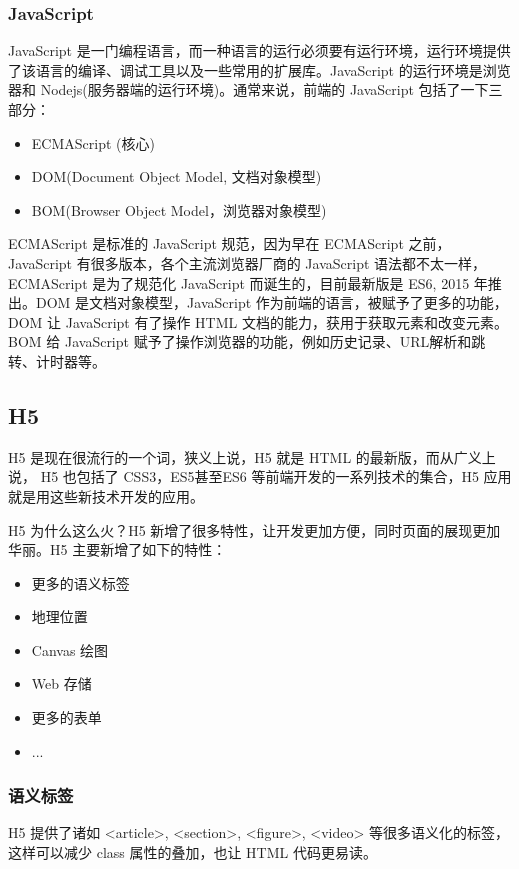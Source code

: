 \documentclass[UTF8]{ctexbook}
\begin{document}
{{            \subsubsection{JavaScript}
              \label{subsubsec:javascript}
                JavaScript 是一门编程语言，而一种语言的运行必须要有运行环境，运行环境提供了该语言的编译、调试工具以及一些常用的扩展库。JavaScript 的运行环境是浏览器和 Nodejs(服务器端的运行环境)。通常来说，前端的 JavaScript 包括了一下三部分：
                \begin{itemize}
                  \item ECMAScript (核心)
                  \item DOM(Document Object Model, 文档对象模型)
                  \item BOM(Browser Object Model，浏览器对象模型)
                \end{itemize}
                ECMAScript 是标准的 JavaScript 规范，因为早在 ECMAScript 之前，JavaScript 有很多版本，各个主流浏览器厂商的 JavaScript 语法都不太一样，ECMAScript 是为了规范化 JavaScript 而诞生的，目前最新版是 ES6, 2015 年推出。DOM 是文档对象模型，JavaScript 作为前端的语言，被赋予了更多的功能，DOM 让 JavaScript 有了操作 HTML 文档的能力，获用于获取元素和改变元素。BOM 给 JavaScript 赋予了操作浏览器的功能，例如历史记录、URL解析和跳转、计时器等。

        \subsection{H5}
          \label{subsec:h5}
            H5 是现在很流行的一个词，狭义上说，H5 就是 HTML 的最新版，而从广义上说， H5 也包括了 CSS3，ES5甚至ES6 等前端开发的一系列技术的集合，H5 应用就是用这些新技术开发的应用。
            \par
            H5 为什么这么火？H5 新增了很多特性，让开发更加方便，同时页面的展现更加华丽。H5 主要新增了如下的特性：
            \begin{itemize}
              \item 更多的语义标签
              \item 地理位置
              \item Canvas 绘图
              \item Web 存储
              \item 更多的表单
              \item ...
            \end{itemize}
            \subsubsection{语义标签}
              \label{subsubsec:语义标签}
                H5 提供了诸如 <article>, <section>, <figure>, <video> 等很多语义化的标签，这样可以减少 class 属性的叠加，也让 HTML 代码更易读。

}}
\end{document}
